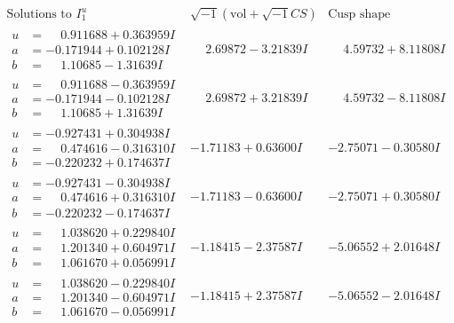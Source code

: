 \documentclass[1p]{elsarticle_modified}
\theoremstyle{definition}
\newcommand{\I}{\sqrt{-1}}
\begin{document}
$$\begin{array}{c|c|c}  
\text{Solutions to }I^u_{1}& \I (\text{vol} + \sqrt{-1}CS) & \text{Cusp shape}\\
 \hline 
\begin{aligned}
u &= \phantom{-}0.911688 + 0.363959 I \\
a &= -0.171944 + 0.102128 I \\
b &= \phantom{-}1.10685 - 1.31639 I\end{aligned}
 & \phantom{-}2.69872 - 3.21839 I & \phantom{-}4.59732 + 8.11808 I \\ \hline\begin{aligned}
u &= \phantom{-}0.911688 - 0.363959 I \\
a &= -0.171944 - 0.102128 I \\
b &= \phantom{-}1.10685 + 1.31639 I\end{aligned}
 & \phantom{-}2.69872 + 3.21839 I & \phantom{-}4.59732 - 8.11808 I \\ \hline\begin{aligned}
u &= -0.927431 + 0.304938 I \\
a &= \phantom{-}0.474616 - 0.316310 I \\
b &= -0.220232 + 0.174637 I\end{aligned}
 & -1.71183 + 0.63600 I & -2.75071 - 0.30580 I \\ \hline\begin{aligned}
u &= -0.927431 - 0.304938 I \\
a &= \phantom{-}0.474616 + 0.316310 I \\
b &= -0.220232 - 0.174637 I\end{aligned}
 & -1.71183 - 0.63600 I & -2.75071 + 0.30580 I \\ \hline\begin{aligned}
u &= \phantom{-}1.038620 + 0.229840 I \\
a &= \phantom{-}1.201340 + 0.604971 I \\
b &= \phantom{-}1.061670 + 0.056991 I\end{aligned}
 & -1.18415 - 2.37587 I & -5.06552 + 2.01648 I \\ \hline\begin{aligned}
u &= \phantom{-}1.038620 - 0.229840 I \\
a &= \phantom{-}1.201340 - 0.604971 I \\
b &= \phantom{-}1.061670 - 0.056991 I\end{aligned}
 & -1.18415 + 2.37587 I & -5.06552 - 2.01648 I \\ \hline\begin{aligned}

\end{aligned}
\end{array}$$
\end{document}

